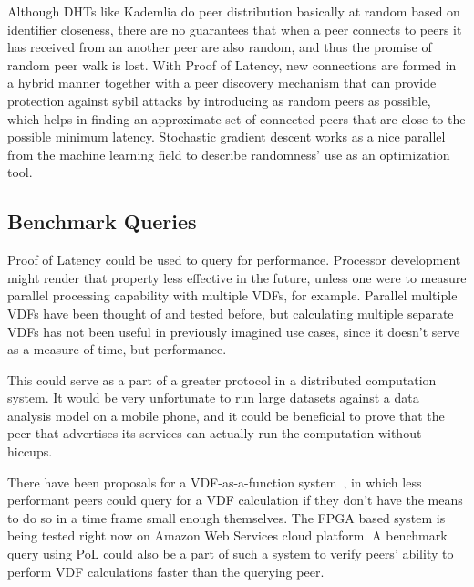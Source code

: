 Although DHTs like Kademlia do peer distribution basically at random based on identifier closeness, there are no guarantees that when a peer connects to peers it has received from an another peer are also random, and thus the promise of random peer walk is lost. With Proof of Latency, new connections are formed in a hybrid manner together with a peer discovery mechanism that can provide protection against sybil attacks by introducing as random peers as possible, which helps in finding an approximate set of connected peers that are close to the possible minimum latency. Stochastic gradient descent works as a nice parallel from the machine learning field to describe randomness' use as an optimization tool.

\subsection{Benchmark Queries}
Proof of Latency could be used to query for performance. Processor development might render that property less effective in the future, unless one were to measure parallel processing capability with multiple VDFs, for example. Parallel multiple VDFs have been thought of and tested before, but calculating multiple separate VDFs has not been useful in previously imagined use cases, since it doesn't serve as a measure of time, but performance.

This could serve as a part of a greater protocol in a distributed computation system. It would be very unfortunate to run large datasets against a data analysis model on a mobile phone, and it could be beneficial to prove that the peer that advertises its services can actually run the computation without hiccups.

There have been proposals for a VDF-as-a-function system~\cite{Devlin2020-qw}, in which less performant peers could query for a VDF calculation if they don't have the means to do so in a time frame small enough themselves. The FPGA based system is being tested right now on Amazon Web Services cloud platform. A benchmark query using PoL could also be a part of such a system to verify peers' ability to perform VDF calculations faster than the querying peer.

